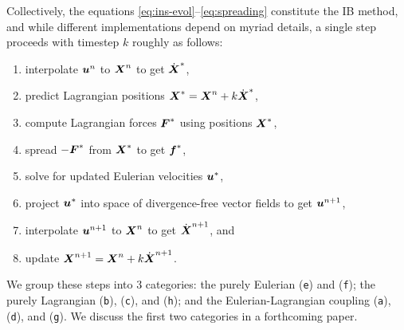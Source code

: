 Collectively, the equations \eqref{eq:ins-evol}--\eqref{eq:spreading} constitute the
IB method, and while different implementations depend on myriad details, a single step
proceeds with timestep $k$ roughly as follows:
\begin{enumerate}[label=(\texttt{\alph*})]
    \item interpolate $\boldsymbol{u}^n$ to $\boldsymbol{X}^n$ to get $\dot{\boldsymbol{X}}^\ast$,
    \item predict Lagrangian positions $\boldsymbol{X}^\ast = \boldsymbol{X}^n + k\dot{\boldsymbol{X}}^\ast$,
    \item compute Lagrangian forces $\boldsymbol{F}^\ast$ using positions $\boldsymbol{X}^\ast$,
    \item spread $-\boldsymbol{F}^\ast$ from $\boldsymbol{X}^\ast$ to get $\boldsymbol{f}^\ast$,
    \item solve for updated Eulerian velocities $\boldsymbol{u}^\ast$,
    \item project $\boldsymbol{u}^\ast$ into space of divergence-free vector fields to get
        $\boldsymbol{u}^{n+1}$,
    \item interpolate $\boldsymbol{u}^{n+1}$ to $\boldsymbol{X}^n$ to get $\dot{\boldsymbol{X}}^{n+1}$, and
    \item update $\boldsymbol{X}^{n+1} = \boldsymbol{X}^n + k \dot{\boldsymbol{X}}^{n+1}$.
\end{enumerate}
We group these steps into 3 categories: the purely Eulerian (\texttt{e}) and
(\texttt{f}); the purely Lagrangian (\texttt{b}), (\texttt{c}), and (\texttt{h}); and the
Eulerian-Lagrangian coupling (\texttt{a}), (\texttt{d}), and (\texttt{g}). We discuss the
first two categories in a forthcoming paper.
%
%
%
%

